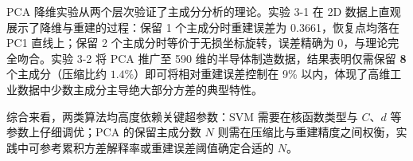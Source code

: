 \documentclass[10.5pt]{config}
\begin{document}
PCA 降维实验从两个层次验证了主成分分析的理论。实验 3-1 在 2D 数据上直观展示了降维与重建的过程：保留 1 个主成分时重建误差为 0.3661，恢复点均落在 PC1 直线上；保留 2 个主成分时等价于无损坐标旋转，误差精确为 0，与理论完全吻合。实验 3-2 将 PCA 推广至 590 维的半导体制造数据，结果表明仅需保留 \textbf{8} 个主成分（压缩比约 $1.4\%$）即可将相对重建误差控制在 9\% 以内，体现了高维工业数据中少数主成分主导绝大部分方差的典型特性。

综合来看，两类算法均高度依赖关键超参数：SVM 需要在核函数类型与 $C$、$d$ 等参数上仔细调优；PCA 的保留主成分数 $N$ 则需在压缩比与重建精度之间权衡，实践中可参考累积方差解释率或重建误差阈值确定合适的 $N$。
\end{document}
